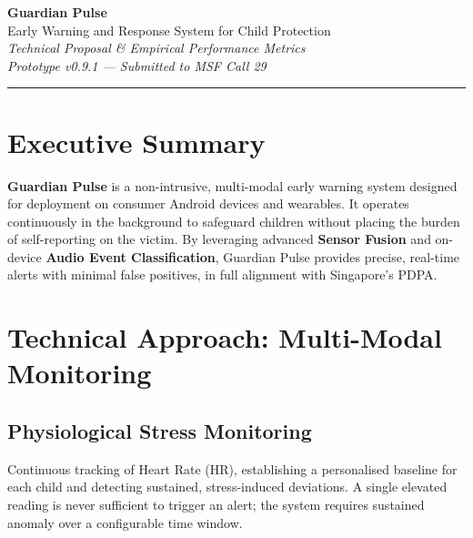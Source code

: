 \documentclass[12pt,a4paper]{article}
\begin{document}
\begin{center}
    \vspace*{1cm}
    {\Huge \textbf{\color{primary} Guardian Pulse}} \\[0.5cm]
    {\LARGE Early Warning and Response System for Child Protection} \\[0.5cm]
    {\large \textit{Technical Proposal \& Empirical Performance Metrics}} \\[0.3cm]
    {\normalsize \textit{Prototype v0.9.1 --- Submitted to MSF Call 29}} \\[0.5cm]
    \rule{\textwidth}{1pt}
\end{center}

\vspace{0.8cm}

\section{Executive Summary}
\textbf{Guardian Pulse} is a non-intrusive, multi-modal early warning system designed for deployment on consumer Android devices and wearables. It operates continuously in the background to safeguard children without placing the burden of self-reporting on the victim. By leveraging advanced \textbf{Sensor Fusion} and on-device \textbf{Audio Event Classification}, Guardian Pulse provides precise, real-time alerts with minimal false positives, in full alignment with Singapore's PDPA.

\section{Technical Approach: Multi-Modal Monitoring}

\subsection{Physiological Stress Monitoring}
Continuous tracking of Heart Rate (HR), establishing a personalised baseline for each child and detecting sustained, stress-induced deviations. A single elevated reading is never sufficient to trigger an alert; the system requires sustained anomaly over a configurable time window.
\end{document}
